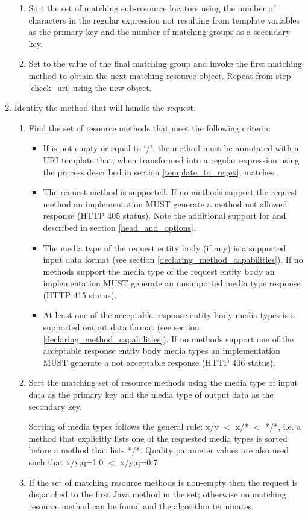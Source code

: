 \begin{enumerate}
\begin{enumerate}
\item Sort the set of matching sub-resource locators using the number of characters in the regular expression not resulting from template variables as the primary key and the number of matching groups as a secondary key.

\item Set  to the value of the final matching group and invoke the first matching method to obtain the next matching resource object. Repeat from step \ref{check_uri} using the new object.
\end{enumerate}

\item \label{find_method} Identify the method that will handle the request.

\begin{enumerate}
\item Find the set of resource methods that meet the following criteria:
\begin{itemize}
\item If  is not empty or equal to \lq/\rq, the method must be annotated with  a URI template that, when transformed into a regular expression using the process described in section \ref{template_to_regex}, matches .
\item The request method is supported. If no methods support the request method an implementation MUST generate a method not allowed response (HTTP 405 status). Note the additional support for  and  described in section \ref{head_and_options}.
\item The media type of the request entity body (if any) is a supported input data format (see section \ref{declaring_method_capabilities}). If no methods support the media type of the request entity body an implementation MUST generate an unsupported media type response (HTTP 415 status).
\item At least one of the acceptable response entity body media types is a supported output data format (see section \ref{declaring_method_capabilities}). If no methods support one of the acceptable response entity body media types an implementation MUST generate a not acceptable response (HTTP 406 status).
\end{itemize} 
\item Sort the matching set of resource methods using the media type of input data as the primary key and the media type of output data as the secondary key.

Sorting of media types follows the general rule: x/y $<$ x/* $<$ */*, i.e. a method that explicitly lists one of the requested media types is sorted before a method that lists */*. Quality parameter values are also used such that x/y;q=1.0 $<$ x/y;q=0.7.

\item \label{dispatch_method} If the set of matching resource methods is non-empty then the request is dispatched to the first Java method in the set; otherwise no matching resource method can be found and the algorithm terminates.
\end{enumerate}

\end{enumerate}

